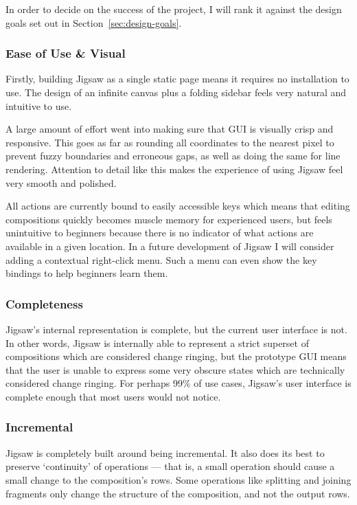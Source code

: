 \documentclass[12pt]{article}
\begin{document}
In order to decide on the success of the project, I will rank it against the design goals set out in
Section~\ref{sec:design-goals}.

\subsubsection{Ease of Use \& Visual}

Firstly, building Jigsaw as a single static page means it requires no installation to use.  The
design of an infinite canvas plus a folding sidebar feels very natural and intuitive to use.

A large amount of effort went into making sure that GUI is visually crisp and responsive.  This
goes as far as rounding all coordinates to the nearest pixel to prevent fuzzy boundaries and
erroneous gaps, as well as doing the same for line rendering.  Attention to detail like this makes
the experience of using Jigsaw feel very smooth and polished.

All actions are currently bound to easily accessible keys which means that editing compositions
quickly becomes muscle memory for experienced users, but feels unintuitive to beginners because
there is no indicator of what actions are available in a given location.  In a future development of
Jigsaw I will consider adding a contextual right-click menu.  Such a menu can even show the key
bindings to help beginners learn them.

\subsubsection{Completeness}

Jigsaw's internal representation is complete, but the current user interface is not.  In other
words, Jigsaw is internally able to represent a strict superset of compositions which are considered
change ringing, but the prototype GUI means that the user is unable to express some very obscure
states which are technically considered change ringing.  For perhaps 99\% of use cases, Jigsaw's
user interface is complete enough that most users would not notice.

\subsubsection{Incremental}

Jigsaw is completely built around being incremental.  It also does its best to preserve `continuity'
of operations --- that is, a small operation should cause a small change to the composition's rows.
Some operations like splitting and joining fragments only change the structure of the composition,
and not the output rows.
\end{document}
